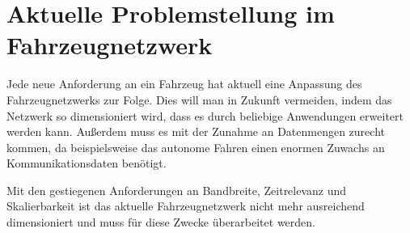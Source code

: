 \section{Aktuelle Problemstellung im Fahrzeugnetzwerk}
Jede neue Anforderung an ein Fahrzeug hat aktuell eine Anpassung des Fahrzeugnetzwerks zur Folge. Dies will man in Zukunft vermeiden, indem das Netzwerk so dimensioniert wird, dass es durch beliebige Anwendungen erweitert werden kann. Außerdem muss es mit der Zunahme an Datenmengen zurecht kommen, da beispielsweise das autonome Fahren einen enormen Zuwachs an Kommunikationsdaten benötigt. 

Mit den gestiegenen Anforderungen an Bandbreite, Zeitrelevanz und Skalierbarkeit ist das aktuelle Fahrzeugnetzwerk nicht mehr ausreichend dimensioniert und muss für diese Zwecke überarbeitet werden.